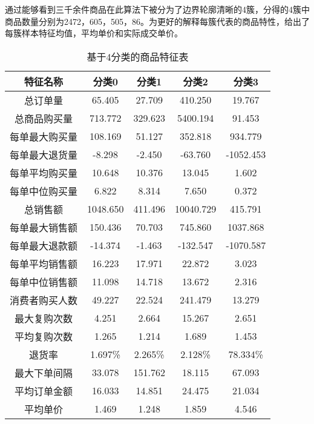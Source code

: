 \documentclass[lang=cn,11pt,a4paper,cite=authoryear]{elegantpaper}
\begin{document}
通过能够看到三千余件商品在此算法下被分为了边界轮廓清晰的4簇，分得的4簇中商品数量分别为2472，605，505，86。为更好的解释每簇代表的商品特性，给出了每簇样本特征均值，平均单价和实际成交单价。
\begin{center}
\begin{longtable}{ccccc}
  \caption{基于4分类的商品特征表}
  \label{基于4分类的商品特征表}\\
    \hline
    \textbf{特征名称} & \textbf{分类0} & \textbf{分类1} & \textbf{分类2} & \textbf{分类3}\\
    \hline
    总订单量 & 65.405 & 27.709 & 410.250 & 19.767\\
    总商品购买量 & 713.772 & 329.623 & 5400.194 & 91.453\\
    每单最大购买量 & 108.169 & 51.127 & 352.818 & 934.779\\
    每单最大退货量 & -8.298 & -2.450 & -63.760 & -1052.453\\
    每单平均购买量 & 10.648 & 10.376 & 13.045 & 1.602\\
    每单中位购买量 & 6.822  & 8.314 & 7.650 & 0.372\\
    总销售额 & 1048.650 & 411.496 & 10040.729 & 415.791\\
    每单最大销售额 & 150.436 & 70.703 & 745.860 & 1037.868\\
    每单最大退款额 & -14.374 & -1.463 & -132.547 & -1070.587\\
    每单平均销售额 & 16.223 & 17.971 & 22.872 & 3.023\\
    每单中位销售额 & 11.098 & 14.718 & 13.672 & 2.316\\
    消费者购买人数 & 49.227 & 22.524 & 241.479 & 13.279\\
    最大复购次数 & 4.251 & 2.664 & 15.267 & 2.651\\
    平均复购次数 & 1.265 & 1.214 & 1.689 & 1.453\\
    退货率 & 1.697\% & 2.265\% & 2.128\% & 78.334\%\\
    最大下单间隔 & 33.078 & 151.762 & 18.115 & 67.093\\
    平均订单金额 & 16.033 & 14.851 & 24.475 & 21.034\\
    平均单价 & 1.469 & 1.248 & 1.859 & 4.546\\
    \hline
\end{longtable}
\end{center}
\end{document}
